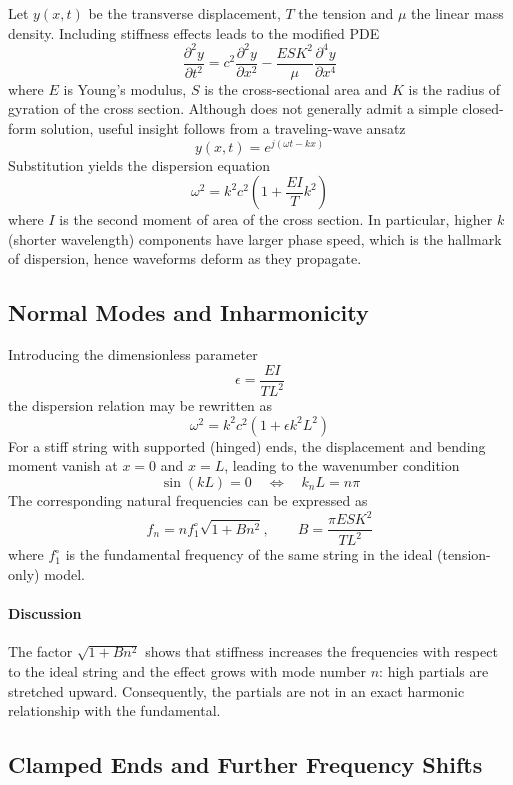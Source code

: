 Let \( y(x,t) \) be the transverse displacement, \( T \) the tension and \( \mu \) the linear mass density. Including stiffness effects leads to the modified PDE
\[
\frac{\partial^{2}y}{\partial t^{2}}
 = 
c^{2}\frac{\partial^{2}y}{\partial x^{2}}
-\frac{ESK^{2}}{\mu}\frac{\partial^{4}y}{\partial x^{4}}
\]
where \( E \) is Young's modulus, \( S \) is the cross-sectional area and \( K \) is the radius of gyration of the cross section. Although does not generally admit a simple closed-form solution, useful insight follows from a traveling-wave ansatz
\[
y(x,t) = e^{j(\omega t-kx)}
\]
Substitution yields the dispersion equation
\[
\omega^{2} = k^{2}c^{2}\left(1 + \frac{EI}{T}k^{2}\right)
\]
where \( I \) is the second moment of area of the cross section. In particular, higher \( k \) (shorter wavelength) components have larger phase speed, which is the hallmark of dispersion, hence waveforms deform as they propagate.

\subsection{Normal Modes and Inharmonicity}

Introducing the dimensionless parameter
\[
\epsilon = \frac{EI}{TL^{2}}
\]
the dispersion relation may be rewritten as
\[
\omega^{2} = k^{2}c^{2}\left(1 + \epsilon k^{2}L^{2}\right)
\]
For a stiff string with supported (hinged) ends, the displacement and bending moment vanish at \( x = 0 \) and \( x = L \), leading to the wavenumber condition
\[
\sin(kL) = 0
\quad\Longleftrightarrow\quad
k_nL = n\pi
\]
The corresponding natural frequencies can be expressed as
\[
f_n = n f_1^{\circ}\sqrt{1 + Bn^{2}},
\qquad
B = \frac{\pi ESK^{2}}{TL^{2}}
\]
where \( f_1^{\circ} \) is the fundamental frequency of the same string in the ideal (tension-only) model. 

\paragraph{Discussion} The factor \( \sqrt{1 + Bn^{2}} \) shows that stiffness increases the frequencies with respect to the ideal string and the effect grows with mode number \( n \): high partials are stretched upward. Consequently, the partials are not in an exact harmonic relationship with the fundamental.

\subsection{Clamped Ends and Further Frequency Shifts}

